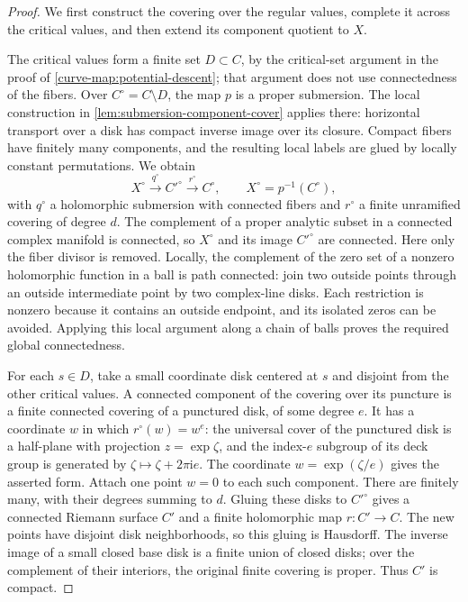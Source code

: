 \begin{proof}
We first construct the covering over the regular values,
complete it across the critical values, and then extend its
component quotient to $X$.

The critical values form a finite set $D\subset C$, by the
critical-set argument in the proof of
\cref{curve-map:potential-descent}; that argument does not use
connectedness of the fibers. Over $C^\circ=C\setminus D$, the
map $p$ is a proper submersion. The local construction in
\cref{lem:submersion-component-cover} applies there: horizontal
transport over a disk has compact inverse image over its
closure. Compact fibers have finitely many components, and
the resulting local labels are glued by locally constant
permutations. We obtain
\[
 X^\circ\xrightarrow{q^\circ}C'^\circ
             \xrightarrow{r^\circ}C^\circ,
 \qquad X^\circ=p^{-1}(C^\circ),
\]
with $q^\circ$ a holomorphic submersion with connected fibers
and $r^\circ$ a finite unramified covering of degree $d$.
The complement of a proper analytic subset in a connected
complex manifold is connected, so $X^\circ$ and its image
$C'^\circ$ are connected.
Here only the fiber divisor is removed. Locally, the complement
of the zero set of a nonzero holomorphic function in a ball is
path connected: join two outside points through an outside
intermediate point by two complex-line disks. Each restriction
is nonzero because it contains an outside endpoint, and its
isolated zeros can be avoided. Applying this local argument
along a chain of balls proves the required global connectedness.

For each $s\in D$, take a small coordinate disk centered at
$s$ and disjoint from the other critical values. A connected
component of the covering over its puncture is a finite
connected covering of a punctured disk, of some degree $e$.
It has a coordinate $w$ in which $r^\circ(w)=w^e$: the
universal cover of the punctured disk is a half-plane with
projection $z=\exp\zeta$, and the index-$e$ subgroup of its
deck group is generated by $\zeta\mapsto\zeta+2\pi\mathrm i e$.
The coordinate $w=\exp(\zeta/e)$ gives the asserted form.
Attach one point $w=0$ to each such component. There are
finitely many, with their degrees summing to $d$. Gluing these
disks to $C'^\circ$ gives a connected Riemann surface $C'$ and
a finite holomorphic map $r:C'\to C$. The new points have
disjoint disk neighborhoods, so this gluing is Hausdorff.
The inverse image of a small closed base disk is a finite
union of closed disks; over the complement of their interiors,
the original finite covering is proper. Thus $C'$ is compact.


\end{proof}

